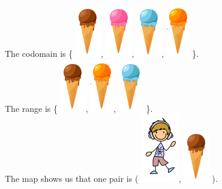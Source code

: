 \documentclass{ximera}
\begin{document}
\begin{example}
The codomain is \{ \includegraphics{pics/r1.png}, \includegraphics{pics/r2.png}, \includegraphics{pics/r3.png}, \includegraphics{pics/r4.png} \}.
\quad \\

The range is \{ \includegraphics{pics/r1.png}, \includegraphics{pics/r4.png}, \includegraphics{pics/r3.png} \}.
\quad \\

The map shows us that one pair is ( \includegraphics{pics/d1.png}, \includegraphics{pics/r1.png} ).

\end{example}
\end{document}
